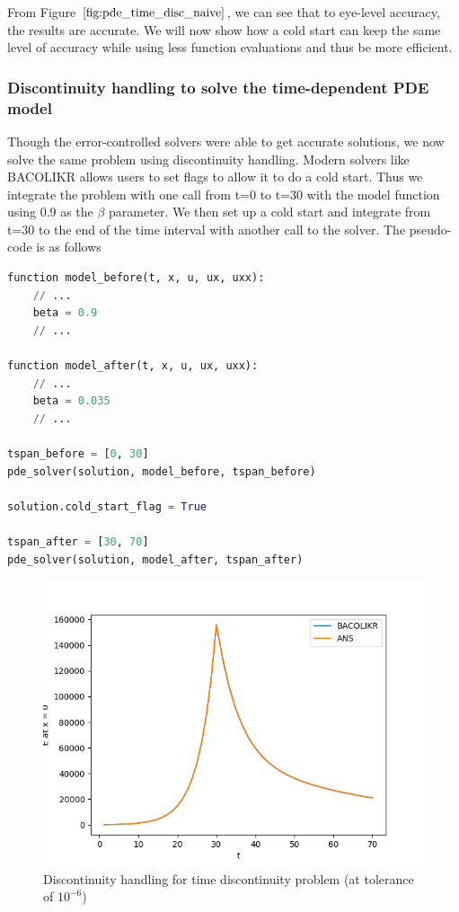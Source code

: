 \documentclass{article}
\begin{document}
From Figure $\ref{fig:pde_time_disc_naive}$, we can see that to eye-level accuracy, the results are accurate. We will now show how a cold start can keep the same level of accuracy while using less function evaluations and thus be more efficient.

\subsubsection{Discontinuity handling to solve the time-dependent PDE model}
\label{subsubsection:pde_time_disc_hand}
Though the error-controlled solvers were able to get accurate solutions, we now solve the same problem using discontinuity handling. Modern solvers like BACOLIKR allows users to set flags to allow it to do a cold start. Thus we integrate the problem with one call from t=0 to t=30 with the model function using 0.9 as the $\beta$ parameter. We then set up a cold start and integrate from t=30 to the end of the time interval with another call to the solver. The pseudo-code is as follows

\begin{minipage}{\linewidth}
\begin{lstlisting}[language=Python]
function model_before(t, x, u, ux, uxx):
    // ...
    beta = 0.9
    // ...
    
function model_after(t, x, u, ux, uxx):
    // ...
    beta = 0.035
    // ...
 
tspan_before = [0, 30]
pde_solver(solution, model_before, tspan_before)

solution.cold_start_flag = True

tspan_after = [30, 70]
pde_solver(solution, model_after, tspan_after)

\end{lstlisting}
\end{minipage}

\begin{figure}[H]
\centering
\includegraphics[width=0.7\linewidth]{./figures/pde_time_disc_disc_hand}
\caption{Discontinuity handling for time discontinuity problem (at tolerance of $10^{-6}$)}
\label{fig:pde_time_disc_disc_hand}
\end{figure}
\end{document}
